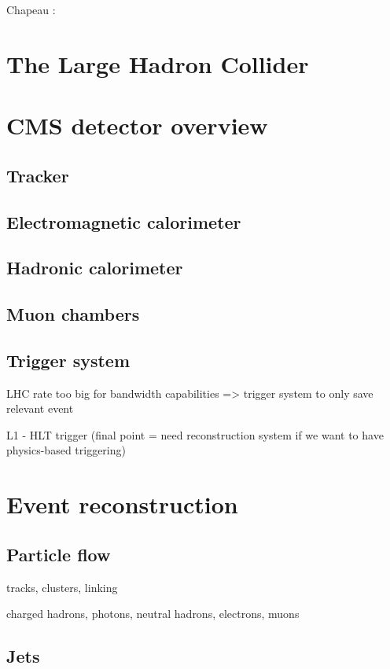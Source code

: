 Chapeau :

\section{The Large Hadron Collider}


\section{CMS detector overview}

\subsection{Tracker}

\subsection{Electromagnetic calorimeter}

\subsection{Hadronic calorimeter}

\subsection{Muon chambers}

\subsection{Trigger system}

LHC rate too big for bandwidth capabilities => trigger system to only save relevant event

L1 - HLT trigger (final point = need reconstruction system if we want to have physics-based triggering)

\section{Event reconstruction}

\subsection{Particle flow}

tracks, clusters, linking

charged hadrons, photons, neutral hadrons, electrons, muons

\subsection{Jets}

